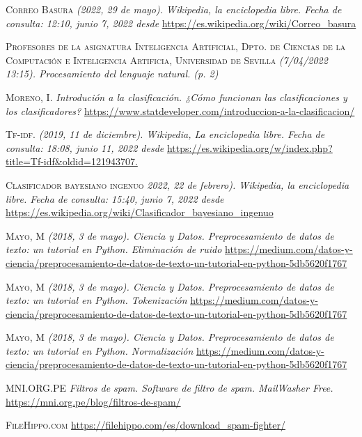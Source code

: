\documentclass[conference,a4paper]{IEEEtran}
\begin{document}
\newpage


\begin{thebibliography}{30}
 \textsc{Correo Basura} \textit{(2022, 29 de mayo). Wikipedia, la enciclopedia libre. Fecha de consulta: 12:10, junio 7, 2022 desde} \url{https://es.wikipedia.org/wiki/Correo_basura}

 \textsc{Profesores de la asignatura Inteligencia Artificial, Dpto. de Ciencias de la Computación e Inteligencia Artificia, Universidad de Sevilla} \textit{(7/04/2022 13:15). Procesamiento del lenguaje natural. (p. 2)}

 \textsc{Moreno, I.} \textit{Introdución a la clasificación. ¿Cómo funcionan las clasificaciones y los clasificadores?} \url{https://www.statdeveloper.com/introduccion-a-la-clasificacion/}

 \textsc{Tf-idf.} \textit{(2019, 11 de diciembre). Wikipedia, La enciclopedia libre. Fecha de consulta: 18:08, junio 11, 2022 desde} \url{https://es.wikipedia.org/w/index.php?title=Tf-idf&oldid=121943707.}

 

 \textsc{Clasificador bayesiano ingenuo} \textit{2022, 22 de febrero). Wikipedia, la enciclopedia libre. Fecha de consulta: 15:40, junio 7, 2022 desde} \url{https://es.wikipedia.org/wiki/Clasificador_bayesiano_ingenuo}

 \textsc{Mayo, M} \textit{(2018, 3 de mayo). Ciencia y Datos. Preprocesamiento de datos de texto: un tutorial en Python. Eliminación de ruido} \url{https://medium.com/datos-y-ciencia/preprocesamiento-de-datos-de-texto-un-tutorial-en-python-5db5620f1767}

 \textsc{Mayo, M} \textit{(2018, 3 de mayo). Ciencia y Datos. Preprocesamiento de datos de texto: un tutorial en Python. Tokenización} \url{https://medium.com/datos-y-ciencia/preprocesamiento-de-datos-de-texto-un-tutorial-en-python-5db5620f1767}

 \textsc{Mayo, M} \textit{(2018, 3 de mayo). Ciencia y Datos. Preprocesamiento de datos de texto: un tutorial en Python. Normalización} \url{https://medium.com/datos-y-ciencia/preprocesamiento-de-datos-de-texto-un-tutorial-en-python-5db5620f1767}

 \textsc{MNI.ORG.PE} \textit{Filtros de spam. Software de filtro de spam. MailWasher Free.} \url{https://mni.org.pe/blog/filtros-de-spam/}


 \textsc{FileHippo.com }  \url{https://filehippo.com/es/download_spam-fighter/}


\end{thebibliography}
\end{document}

